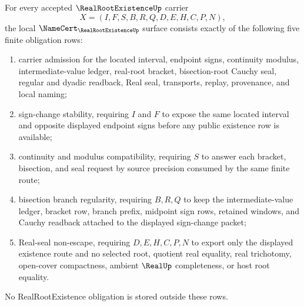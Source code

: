 
\begin{theorem}\label{thm:real-root-existence-namecert-obligations}
For every accepted $\RealRootExistenceUp$ carrier
$$
X=(I,F,S,B,R,Q,D,E,H,C,P,N),
$$
the local $\NameCert_{\RealRootExistenceUp}$ surface consists exactly of the following five finite obligation rows:
\begin{enumerate}
\item carrier admission for the located interval, endpoint signs, continuity modulus, intermediate-value ledger, real-root bracket, bisection-root Cauchy seal, regular and dyadic readback, Real seal, transports, replay, provenance, and local naming;
\item sign-change stability, requiring $I$ and $F$ to expose the same located interval and opposite displayed endpoint signs before any public existence row is available;
\item continuity and modulus compatibility, requiring $S$ to answer each bracket, bisection, and seal request by source precision consumed by the same finite route;
\item bisection branch regularity, requiring $B,R,Q$ to keep the intermediate-value ledger, bracket row, branch prefix, midpoint sign rows, retained windows, and Cauchy readback attached to the displayed sign-change packet;
\item Real-seal non-escape, requiring $D,E,H,C,P,N$ to export only the displayed existence route and no selected root, quotient real equality, real trichotomy, open-cover compactness, ambient $\RealUp$ completeness, or host root equality.
\end{enumerate}
No RealRootExistence obligation is stored outside these rows.
\end{theorem}
